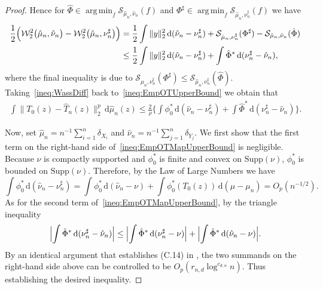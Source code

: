 \documentclass[11pt]{article}
\DeclareMathOperator*{\argmin}{arg\,min}
\begin{document}
\begin{proof}
Hence for $\hat \Phi \in \argmin_f \mathcal{S}_{\hat \mu_n, \hat \nu_n}(f)$ and $\Phi^\sharp \in \argmin_f\mathcal{S}_{\hat \mu_n, \nu_n^\sharp}(f)$ we have 
\begin{align}
 \frac{1}{2}\Bigl(\mathcal{W}_2^2\bigl(\hat{\mu}_n, \hat{\nu}_n\bigr) - \mathcal{W}_2^2\bigl(\hat{\mu}_n, \nu_n^{\sharp}\bigr)\Bigr) &= \frac{1}{2}\int \|y\|_2^2 \, \mathrm{d}(\hat \nu_n - \nu_n^\sharp) + \mathcal{S}_{\hat \mu_n, \nu_n^\sharp}(\Phi^\sharp) - \mathcal{S}_{\hat \mu_n, \hat \nu_n}(\hat \Phi) \notag \\ 
 & \leq \frac{1}{2}\int \|y\|_2^2 \, \mathrm{d}(\hat \nu_n - \nu_n^\sharp) + \int \hat \Phi^* \, \mathrm{d}(\nu_n^\sharp - \hat \nu_n),\label{ineq:WassDiff}
\end{align}
where the final inequality is due to $\mathcal{S}_{\hat \mu_n, \nu_n^\sharp}(\Phi^\sharp) \leq \mathcal{S}_{\hat \mu_n, \nu_n^\sharp}(\hat\Phi)$. Taking~\eqref{ineq:WassDiff} back to~\eqref{ineq:EmpOTUpperBound} we obtain that 
\begin{align}
\int \|T_0(z) - \hat T_n(z)\|_2^{p}  \, \mathrm{d}\hat \mu_n(z) \leq \frac{2}{\rho} \biggl\{\int \phi_0^*\, \mathrm{d}(\hat \nu_n - \nu_n^\sharp) + \int \hat\Phi^* \, \mathrm{d}(\nu_n^\sharp - \hat \nu_n)\biggr\}. \label{ineq:EmpOTMapUpperBound}
\end{align}

Now, set $\hat{\mu}_n= n^{-1} \sum_{i=1}^n \delta_{X_i}$ and $\hat{\nu}_n=n^{-1} \sum_{j=1}^n \delta_{Y_j}$. We first show that the first term on the right-hand side of~\eqref{ineq:EmpOTMapUpperBound} is negligible. Because $\nu$ is compactly supported and $\phi_0^*$ is finite and convex on $\mathrm{Supp}(\nu)$, $\phi_0^*$ is bounded on $\mathrm{Supp}(\nu)$. Therefore, by the Law of Large Numbers we have
\[
\int \phi_0^*\, \mathrm{d}(\hat \nu_n - \nu_n^\sharp) = \int \phi_0^*\, \mathrm{d}(\hat \nu_n - \nu) + \int \phi_0^*(T_0(z)) \, \mathrm{d}(\mu- \mu_n) = O_p(n^{-1/2}). 
\]
As for the second term of~\eqref{ineq:EmpOTMapUpperBound}, by the triangle inequality
\[
\Bigl|\int \hat\Phi^* \, \mathrm{d}(\nu_n^\sharp - \hat \nu_n)\Bigr| \leq \Bigl|\int \hat\Phi^* \, \mathrm{d}(\nu_n^\sharp - \nu)\Bigr|  + \Bigl|\int \hat\Phi^* \, \mathrm{d}(\hat \nu_n - \nu)\Bigr| .
\]
By an identical argument that establishes (C.14) in \citet{Deb2021RatesOEsupp}, the two summands on the right-hand side above can be controlled to be $O_p(r_{n, d}\log^{c_{d, \alpha}} n)$. Thus establishing the desired inequality. 
\end{proof}
\end{document}
